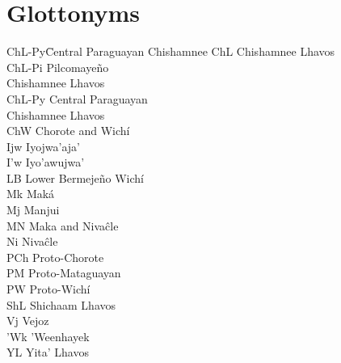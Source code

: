 \addchap{\lsAbbreviationsTitle}\label{abbr}

\section*{Glottonyms}
\begin{multicols}{2}
\begin{tabbing}
ChL-Py\hspace{1ex}\=Central Paraguayan Chishamnee\kill
ChL \> Chishamnee Lhavos\\
ChL-Pi \> Pilcomayeño \\ \> Chishamnee Lhavos\\
ChL-Py \> Central Paraguayan \\ \> Chishamnee Lhavos\\
ChW \> Chorote and Wichí\\
Ijw \> Iyojwa’aja’\\
I’w \> Iyo’awujwa’\\
LB \> Lower Bermejeño Wichí\\
Mk \> Maká\\
Mj \> Manjui\\
MN \> Maka and Nivaĉle\\
Ni \> Nivaĉle\\
PCh \> Proto-Chorote\\
PM \> Proto-Mataguayan\\
PW \> Proto-Wichí\\
ShL \> Shichaam Lhavos\\
Vj \> Vejoz\\
’Wk \> ’Weenhayek\\
YL \> Yita’ Lhavos
\end{tabbing}
\end{multicols}


